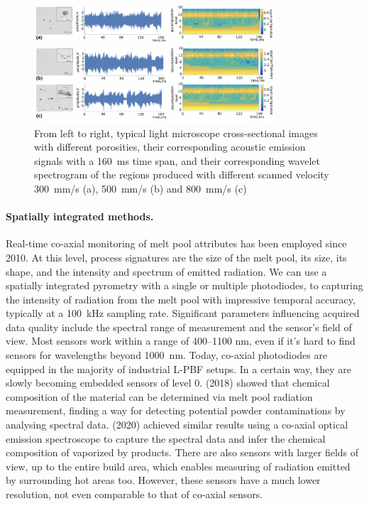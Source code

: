 \begin{figure}
    \centering
    \includegraphics[width = 0.8\textwidth]{Images/acustic.png}
    \caption[Example of AE of different porosities specimens.] {From left to right, typical light microscope cross-sectional images with different porosities, their corresponding acoustic emission signals with a \SI{160}{\milli\second} time span, and their corresponding wavelet spectrogram of the regions produced with different scanned velocity \SI{300}{\milli\metre / \second} (a), \SI{500}{\milli\metre / \second} (b) and \SI{800}{\milli\metre /\second} (c) \cite{wasmer_situ_2019}}
    \label{fig:acustic}
\end{figure}
\paragraph{Spatially integrated methods.} Real-time co-axial monitoring of melt pool attributes has been employed since 2010. At this level, process signatures are the size of the melt pool, its size, its shape, and the intensity and spectrum of emitted radiation. We can use a spatially integrated pyrometry with a  single or multiple photodiodes, to capturing the intensity of radiation from the melt pool with impressive temporal accuracy, typically at a \SI{100}{\kilo\hertz} sampling rate. Significant parameters influencing acquired data quality include the spectral range of measurement and the sensor's field of view. Most sensors work within a range of \numrange{400}{1100} \unit{\nano\metre}, even if it's hard to find sensors for wavelengths beyond \SI{1000}{\nano\metre}. Today, co-axial photodiodes are equipped in the majority of industrial L-PBF setups. In a certain way, they are slowly becoming embedded sensors of level 0. \citeauthor{montazeri_-process_2018} (2018) showed that chemical composition of the material can be determined via melt pool radiation measurement, finding a way for detecting potential powder contaminations by analysing spectral data. \citeauthor{lough_-situ_2020} (2020) achieved similar results using a co-axial optical emission spectroscope to capture the spectral data and infer the chemical composition of vaporized by products. There are also sensors with larger fields of view, up to the entire build area, which enables measuring of radiation emitted by surrounding hot areas too. However, these sensors have a much lower resolution, not even comparable to that of co-axial sensors.
